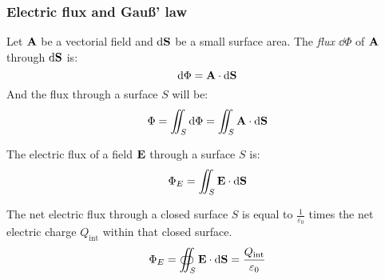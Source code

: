 \documentclass[../../../main.tex]{subfiles}
\begin{document}
\begin{multicols}{2}
    \subsubsection{Electric flux and Gau\ss' law}
    \begin{definition}
        Let $\boldsymbol{\mathrm{A}}$ be a vectorial field and $\dd\boldsymbol{\mathrm{S}}$ be a small surface area. The \textit{flux $\dd \Phi$} of $\boldsymbol{\mathrm{A}}$ through $\dd \boldsymbol{\mathrm{S}}$ is:
        $$\dd \Phi=\boldsymbol{\mathrm{A}}\cdot\dd\boldsymbol{\mathrm{S}}$$ And the flux through a surface $S$ will be:
        $$\Phi=\iint_S \dd\Phi=\iint_S\boldsymbol{\mathrm{A}}\cdot \dd\boldsymbol{\mathrm{S}}$$
    \end{definition}
    \begin{corollary}
        The electric flux of a field $\boldsymbol{\mathrm{E}}$ through a surface $S$ is:
        $$\Phi_E=\iint_S\boldsymbol{\mathrm{E}}\cdot \dd\boldsymbol{\mathrm{S}}$$
    \end{corollary}
    \begin{law}
        The net electric flux through a closed surface $S$ is equal to $\frac{1}{\varepsilon_0}$ times the net electric charge $Q_\text{int}$ within that closed surface.
        $$\Phi_E=\oiint_S\boldsymbol{\mathrm{E}}\cdot\dd\boldsymbol{\mathrm{S}}=\frac{Q_\text{int}}{\varepsilon_0}$$
    \end{law}

\end{multicols}
\end{document}
